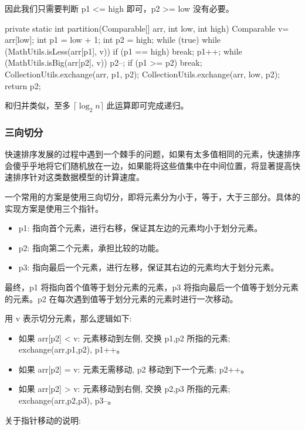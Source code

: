 因此我们只需要判断 p1 <= high 即可，p2 >= low 没有必要。

\begin{Java}
private static int partition(Comparable[] arr, int low, int high) {
    Comparable v= arr[low];
    int p1 = low + 1;
    int p2 = high;
    while (true) {
        while (MathUtils.isLess(arr[p1], v)) {
            if (p1 == high)
                break;
            p1++;
        }
        while (MathUtils.isBig(arr[p2], v)) {
            p2--;
        }
        if (p1 >= p2) break;
        CollectionUtils.exchange(arr, p1, p2);
    }
    CollectionUtils.exchange(arr, low, p2);
    return p2;
}
\end{Java}

和归并类似，至多 $\lceil \log_2 n \rceil$ 此运算即可完成递归。

\subsubsection{三向切分}

快速排序发展的过程中遇到一个棘手的问题，如果有太多值相同的元素，快速排序会傻乎乎地将它们随机放在一边，如果能将这些值集中在中间位置，将显著提高快速排序针对这类数据模型的计算速度。

一个常用的方案是使用三向切分，即将元素分为小于，等于，大于三部分。具体的实现方案是使用三个指针。
\begin{itemize}
  \item p1: 指向首个元素，进行右移，保证其左边的元素均小于划分元素。
  \item p2: 指向第二个元素，承担比较的功能。
  \item p3: 指向最后一个元素，进行左移，保证其右边的元素均大于划分元素。
\end{itemize}

最终，p1 将指向首个值等于划分元素的元素，p3 将指向最后一个值等于划分元素的元素。p2 在每次遇到值等于划分元素的元素时进行一次移动。

用 v 表示切分元素，那么逻辑如下:
\begin{itemize}
  \item 如果 arr[p2] < v: 元素移动到左侧, 交换 p1,p2 所指的元素; exchange(arr,p1,p2), p1++。
  \item 如果 arr[p2] = v: 元素无需移动, p2 移动到下一个元素; p2++。
  \item 如果 arr[p2] > v: 元素移动到右侧, 交换 p2,p3 所指的元素; exchange(arr,p2,p3), p3--。
\end{itemize}

关于指针移动的说明:

